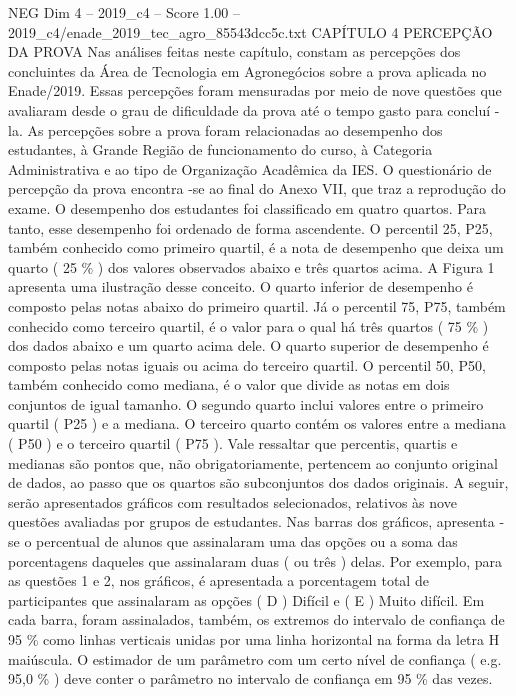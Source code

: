 \begin{textsample}{NEG Dim 4 – 2019\_c4 – Score 1.00 – 2019\_c4/enade\_2019\_tec\_agro\_85543dcc5c.txt}  \label{ex:f4_neg_244}
CAPÍTULO 4 PERCEPÇÃO DA PROVA Nas análises feitas neste capítulo, constam as percepções dos concluintes da Área de Tecnologia em Agronegócios sobre a prova aplicada no Enade/2019.
Essas percepções foram mensuradas por meio de nove questões que avaliaram desde o grau de dificuldade da prova até o tempo gasto para concluí -la.
As percepções sobre a prova foram relacionadas ao desempenho dos estudantes, à Grande Região de funcionamento do curso, à Categoria Administrativa e ao tipo de Organização Acadêmica da IES.
O questionário de percepção da prova encontra -se ao final do Anexo VII, que traz a reprodução do exame.
O desempenho dos estudantes foi classificado em quatro quartos.
Para tanto, esse desempenho foi ordenado de forma ascendente.
O percentil 25, P25, também conhecido como primeiro quartil, é a nota de desempenho que deixa um quarto ( 25 \% ) dos valores observados abaixo e três quartos acima.
A Figura 1 apresenta uma ilustração desse conceito.
O quarto inferior de desempenho é composto pelas notas abaixo do primeiro quartil.
Já o percentil 75, P75, também conhecido como terceiro quartil, é o valor para o qual há três quartos ( 75 \% ) dos dados abaixo e um quarto acima dele.
O quarto superior de desempenho é composto pelas notas iguais ou acima do terceiro quartil.
O percentil 50, P50, também conhecido como mediana, é o valor que divide as notas em dois conjuntos de igual tamanho.
O segundo quarto inclui valores entre o primeiro quartil ( P25 ) e a mediana.
O terceiro quarto contém os valores entre a mediana ( P50 ) e o terceiro quartil ( P75 ).
Vale ressaltar que percentis, quartis e medianas são pontos que, não obrigatoriamente, pertencem ao conjunto original de dados, ao passo que os quartos são subconjuntos dos dados originais.
A seguir, serão apresentados gráficos com resultados selecionados, relativos às nove questões avaliadas por grupos de estudantes.
Nas barras dos gráficos, apresenta -se o percentual de alunos que assinalaram uma das opções ou a soma das porcentagens daqueles que assinalaram duas ( ou três ) delas.
Por exemplo, para as questões 1 e 2, nos gráficos, é apresentada a porcentagem total de participantes que assinalaram as opções ( D ) Difícil e ( E ) Muito difícil.
Em cada barra, foram assinalados, também, os extremos do intervalo de confiança de 95 \% como linhas verticais unidas por uma linha horizontal na forma da letra H maiúscula.
O estimador de um parâmetro com um certo nível de confiança ( e.g. 95,0 \% ) deve conter o parâmetro no intervalo de confiança em 95 \% das vezes.

\end{textsample}
